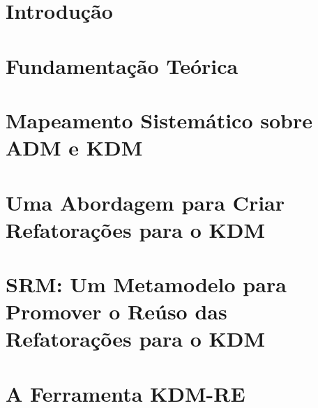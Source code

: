 \documentclass[doutorado, pre-defesa, spanish, english, brazil]{packages/icmc}
\begin{document}
\textual

\chapter{Introdução}
\label{chapter:introducao}


\chapter{Fundamentação Teórica}
\label{chapter:fundamentacao_teorica}


%

\chapter{Mapeamento Sistemático sobre ADM e KDM}\label{chapter:mapeamento_sistematico}


\chapter{Uma Abordagem para Criar Refatorações para o KDM}\label{chapter:catalogo_refactoring_KDM}


\chapter{SRM: Um Metamodelo para Promover o Reúso das Refatorações para o KDM}
\label{chapter:Toward_a_Refactoring_Metamodel_for_KDM}


%

\chapter{A Ferramenta KDM-RE}\label{chapter:ferramenta_kdm_re}

\end{document}
